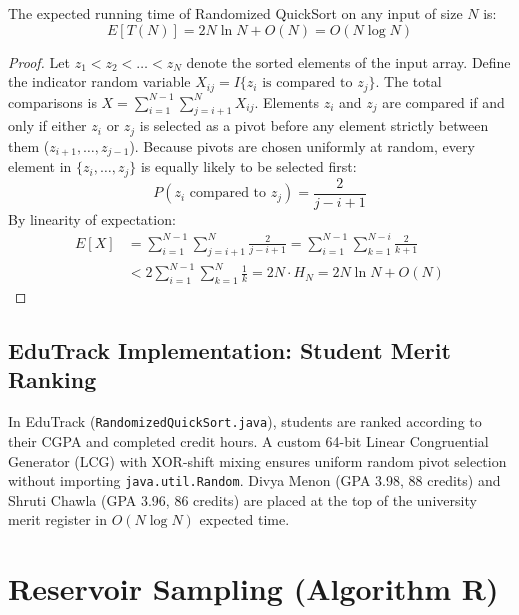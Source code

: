 \begin{theorem}
The expected running time of Randomized QuickSort on any input of size $N$ is:
\begin{equation}
E[T(N)] = 2N \ln N + O(N) = O(N \log N)
\end{equation}
\end{theorem}
\begin{proof}
Let $z_1 < z_2 < \dots < z_N$ denote the sorted elements of the input array. Define the indicator random variable $X_{ij} = I\{z_i \text{ is compared to } z_j\}$. The total comparisons is $X = \sum_{i=1}^{N-1} \sum_{j=i+1}^N X_{ij}$.
Elements $z_i$ and $z_j$ are compared if and only if either $z_i$ or $z_j$ is selected as a pivot before any element strictly between them ($z_{i+1}, \dots, z_{j-1}$). Because pivots are chosen uniformly at random, every element in $\{z_i, \dots, z_j\}$ is equally likely to be selected first:
\begin{equation}
P(z_i \text{ compared to } z_j) = \frac{2}{j - i + 1}
\end{equation}
By linearity of expectation:
\begin{align}
E[X] &= \sum_{i=1}^{N-1} \sum_{j=i+1}^N \frac{2}{j - i + 1} = \sum_{i=1}^{N-1} \sum_{k=1}^{N-i} \frac{2}{k + 1} \nonumber \\
&< 2 \sum_{i=1}^{N-1} \sum_{k=1}^N \frac{1}{k} = 2N \cdot H_N = 2N \ln N + O(N)
\end{align}
\end{proof}

\subsection{EduTrack Implementation: Student Merit Ranking}
In EduTrack (\texttt{RandomizedQuickSort.java}), students are ranked according to their CGPA and completed credit hours. A custom 64-bit Linear Congruential Generator (LCG) with XOR-shift mixing ensures uniform random pivot selection without importing \texttt{java.util.Random}. Divya Menon (GPA 3.98, 88 credits) and Shruti Chawla (GPA 3.96, 86 credits) are placed at the top of the university merit register in $O(N \log N)$ expected time.

\section{Reservoir Sampling (Algorithm R)}
